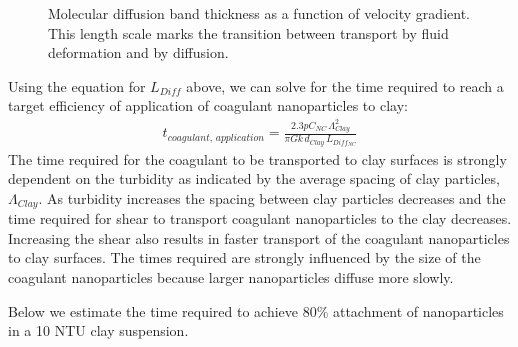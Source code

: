 \documentclass[letterpaper,10pt,english]{sphinxmanual}
\let\sphinxpxdimen\pdfpxdimen\else\newdimen\sphinxpxdimen
\begin{document}
\begin{figure}[htbp]
\centering
\capstart

\noindent\sphinxincludegraphics[width=400\sphinxpxdimen]{{Diffusion_band_thickness}.png}
\caption{Molecular diffusion band thickness as a function of velocity gradient. This length scale marks the transition between transport by fluid deformation and by diffusion.}\label{\detokenize{Rapid_Mix/RM_Theory_and_Future_Work:id1}}\label{\detokenize{Rapid_Mix/RM_Theory_and_Future_Work:figure-diffusion-band-thickness}}\end{figure}

Using the equation for \(L_{Diff}\) above, we can solve for  the time required to reach a target efficiency of application of coagulant nanoparticles to clay:
\begin{equation}\label{equation:Rapid_Mix/RM_Theory_and_Future_Work:Rapid_Mix/RM_Theory_and_Future_Work:27}
\begin{split}t_{coagulant, \, application} = \frac{2.3p C_{NC} \, \Lambda_{Clay}^2}{\pi G k \, d_{Clay}\,  L_{Diff_{NC}} }\end{split}
\end{equation}
The time required for the coagulant to be transported to clay surfaces is strongly dependent on the turbidity as indicated by the average spacing of clay particles, \(\Lambda_{Clay}\). As turbidity increases the spacing between clay particles decreases and the time required for shear to transport coagulant nanoparticles to the clay decreases. Increasing the shear also results in faster transport of the coagulant nanoparticles to clay surfaces. The times required are strongly influenced by the size of the coagulant nanoparticles because larger nanoparticles diffuse more slowly.

Below we estimate the time required to achieve 80\% attachment of nanoparticles in a 10 NTU clay suspension.
\end{document}
